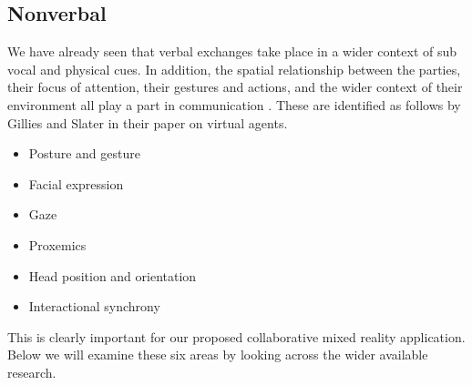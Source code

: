 \subsection{Nonverbal}
We have already seen that verbal exchanges take place in a wider context of sub vocal and physical cues. In addition, the spatial relationship between the parties, their focus of attention, their gestures and actions, and the wider context of their environment all play a part in communication \cite{Goodwin2000}. These are identified as follows by Gillies and Slater \cite{Gillies2005} in their paper on virtual agents.\par
\begin{itemize}
\item Posture and gesture
\item Facial expression
\item Gaze
\item Proxemics
\item Head position and orientation
\item Interactional synchrony
\end{itemize}

This is clearly important for our proposed collaborative mixed reality application. Below we will examine these six areas by looking across the wider available research.

